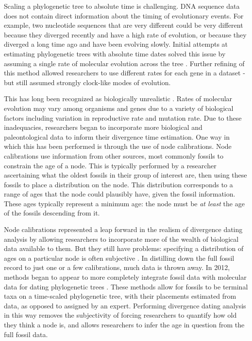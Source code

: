 \documentclass[12pt]{article}
\begin{document}
Scaling a phylogenetic tree to absolute time is challenging.
DNA sequence data does not contain direct information about the timing of evolutionary events.
For example, two nucleotide sequences that are very different could be very different because they diverged recently and have a high rate of evolution, or because they diverged a long time ago and have been evolving slowly. 
Initial attempts at estimating phylogenetic trees with absolute time dates solved this issue by assuming a single rate of molecular evolution across the tree \cite{Zuckerkandl1962}. 
Further refining of this method allowed researchers to use different rates for each gene in a dataset - but still assumed strongly clock-like modes of evolution. \par
This has long been recognized as biologically unrealistic \cite{Aris-Brosou2007, Baele2012}. 
Rates of molecular evolution may vary among organisms and genes due to a variety of biological factors including variation in reproductive rate and mutation rate.
Due to these inadequacies, researchers began to incorporate more biological and paleontological data to inform their divergence time estimation. 
One way in which this has been performed is through the use of node calibrations.
Node calibrations use information from other sources, most commonly fossils to constrain the age of a node.
This is typically performed by a researcher ascertaining what the oldest fossils in their group of interest are, then using these fossils to place a distribution on the node.
This distribution corresponds to a range of ages that the node could plausibly have, given the fossil information.
These ages typically represent a minimum age: the node must be \textit{at least} the age of the fossils descending from it. \par
Node calibrations represented a leap forward in the realism of divergence dating analysis by allowing researchers to incorporate more of the wealth of biological data available to them.
But they still have problems: specifying a distribution of ages on a particular node is often subjective \cite{Aris-Brosou2002, Lepage2007, heath2014}. 
In distilling down the full fossil record to just one or a few calibrations, much data is thrown away.
In 2012, methods began to appear to more completely integrate fossil data with molecular data for dating phylogenetic trees \cite{ronquist2012}.
These methods allow for fossils to be terminal taxa on a time-scaled phylogenetic tree, with their placements estimated from data, as opposed to assigned by an expert.
Performing divergence dating analysis in this way removes the subjectivity of forcing researchers to quantify how old they think a node is, and allows researchers to infer the age in question from the full fossil data. \par
\end{document}
